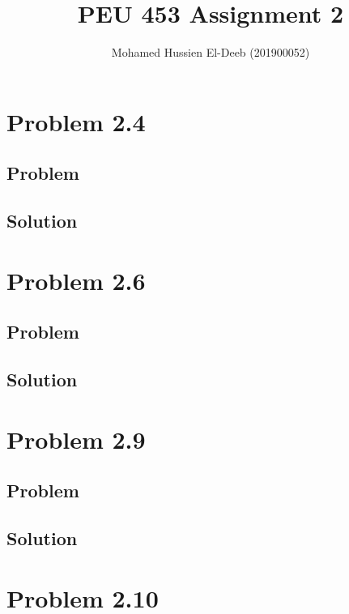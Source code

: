 \documentclass[12pt]{article}
\title{PEU 453 Assignment 2}
\author{Mohamed Hussien El-Deeb (201900052)}
\date{}
\begin{document}
\maketitle
\tableofcontents

\section{Problem 2.4}

\subsection{Problem}

\subsection{Solution}

\newpage

\section{Problem 2.6}

\subsection{Problem}

\subsection{Solution}

\newpage

\section{Problem 2.9}

\subsection{Problem}

\subsection{Solution}

\newpage

\section{Problem 2.10}
\end{document}
